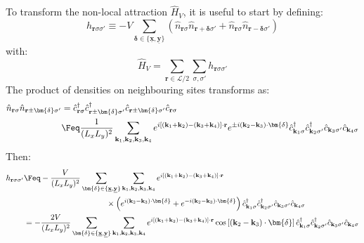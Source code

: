 
To transform the non-local attraction $\hat H_V$, it is useful to start by defining:
\[
	h_{\mathbf{r}\sigma\sigma'} \equiv - V \sum_{\bm{\delta}\in \lbrace \underline{\mathbf{x}}, \underline{\mathbf{y}} \rbrace} \left(
		\hat n_{\mathbf{r}\sigma} \hat n_{\mathbf{r} + \bm{\delta} \sigma'} + \hat n_{\mathbf{r}\sigma} \hat n_{\mathbf{r} - \bm{\delta} \sigma'}
	\right)
\]
with:
\[
	\hat H_V = \sum_{\mathbf{r}\in\mathcal{L}/2} \sum_{\sigma,\sigma'} h_{\mathbf{r}\sigma\sigma'}
\]
The product of densities on neighbouring sites transforms as:
\[
\begin{aligned}
	\hat n_{\mathbf{r}\sigma} \hat n_{\mathbf{r} \pm \bm{\delta} \sigma'} &= \hat c_{\mathbf{r}\sigma}^\dagger \hat c_{\mathbf{r} \pm \bm{\delta} \sigma'}^\dagger \hat c_{\mathbf{r} \pm \bm{\delta} \sigma'} \hat c_{\mathbf{r}\sigma} \\
	&\Feq \frac{1}{(L_xL_y)^2} \sum_{\mathbf{k}_1,\mathbf{k}_2,\mathbf{k}_3,\mathbf{k}_4}
	e^{i \left[ (\mathbf{k}_1 + \mathbf{k}_2) - (\mathbf{k}_3 + \mathbf{k}_4) \right] \cdot \mathbf{r}} e^{\pm i(\mathbf{k}_2-\mathbf{k}_3) \cdot \bm{\delta}}  \hat c_{\mathbf{k}_1 \sigma}^\dagger \hat c_{\mathbf{k}_2 \sigma'}^\dagger \hat c_{\mathbf{k}_3 \sigma'} \hat c_{\mathbf{k}_4\sigma}
\end{aligned}
\]
Then:
\[
\begin{aligned}
	h_{\mathbf{r}\sigma\sigma'} &\Feq -\frac{V}{(L_xL_y)^2} \sum_{\bm{\delta}\in \lbrace \underline{\mathbf{x}}, \underline{\mathbf{y}} \rbrace} \sum_{\mathbf{k}_1,\mathbf{k}_2,\mathbf{k}_3,\mathbf{k}_4} e^{i \left[ (\mathbf{k}_1 + \mathbf{k}_2) - (\mathbf{k}_3 + \mathbf{k}_4) \right] \cdot \mathbf{r}} \\
	&\hspace{0.3\textwidth} \times \left(
	e^{ i(\mathbf{k}_2-\mathbf{k}_3) \cdot \bm{\delta}} + e^{ -i(\mathbf{k}_2-\mathbf{k}_3) \cdot \bm{\delta}}
	\right)
	\hat c_{\mathbf{k}_1 \sigma}^\dagger \hat c_{\mathbf{k}_2 \sigma'}^\dagger \hat c_{\mathbf{k}_3 \sigma'} \hat c_{\mathbf{k}_4\sigma} \\
	&= -\frac{2V}{(L_xL_y)^2} \sum_{\bm{\delta}\in \lbrace \underline{\mathbf{x}}, \underline{\mathbf{y}} \rbrace} \sum_{\mathbf{k}_1,\mathbf{k}_2,\mathbf{k}_3,\mathbf{k}_4} e^{i \left[ (\mathbf{k}_1 + \mathbf{k}_2) - (\mathbf{k}_3 + \mathbf{k}_4) \right] \cdot \mathbf{r}} \cos\left[
	(\mathbf{k}_2-\mathbf{k}_3) \cdot \bm{\delta}
	\right]	\hat c_{\mathbf{k}_1 \sigma}^\dagger \hat c_{\mathbf{k}_2 \sigma'}^\dagger \hat c_{\mathbf{k}_3 \sigma'} \hat c_{\mathbf{k}_4\sigma}
\end{aligned}
\]
